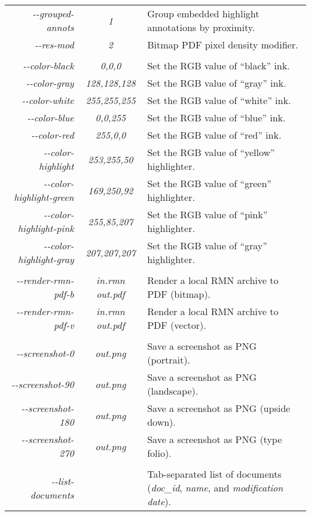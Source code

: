 \begin{longtable}{ r | c | l }
\textit{\--\--grouped-annots} & \textit{1} & Group embedded highlight annotations by proximity. \\
\textit{\--\--res-mod} & \textit{2} & Bitmap PDF pixel density modifier. \\
&&\\
\textit{\--\--color-black} & \textit{0,0,0} & Set the RGB value of ``black'' ink. \\
\textit{\--\--color-gray} & \textit{128,128,128} & Set the RGB value of ``gray'' ink. \\
\textit{\--\--color-white} & \textit{255,255,255} & Set the RGB value of ``white'' ink. \\
\textit{\--\--color-blue} & \textit{0,0,255} & Set the RGB value of ``blue'' ink. \\
\textit{\--\--color-red} & \textit{255,0,0} & Set the RGB value of ``red'' ink. \\
\textit{\--\--color-highlight} & \textit{253,255,50} & Set the RGB value of ``yellow'' highlighter. \\
\textit{\--\--color-highlight-green} & \textit{169,250,92} & Set the RGB value of ``green'' highlighter. \\
\textit{\--\--color-highlight-pink} & \textit{255,85,207} & Set the RGB value of ``pink'' highlighter. \\
\textit{\--\--color-highlight-gray} & \textit{207,207,207} & Set the RGB value of ``gray'' highlighter. \\
&&\\
\textit{\--\--render-rmn-pdf-b} & \textit{in.rmn \hspace{0.2cm} out.pdf} & Render a local RMN archive to PDF (bitmap). \\
\textit{\--\--render-rmn-pdf-v} & \textit{in.rmn \hspace{0.2cm} out.pdf} & Render a local RMN archive to PDF (vector). \\
&&\\
\textit{\--\--screenshot-0}  & \textit{out.png} & Save a screenshot as PNG (portrait). \\
\textit{\--\--screenshot-90} & \textit{out.png} & Save a screenshot as PNG (landscape). \\
\textit{\--\--screenshot-180}  & \textit{out.png} & Save a screenshot as PNG (upside down). \\
\textit{\--\--screenshot-270} & \textit{out.png} & Save a screenshot as PNG (type folio). \\
&&\\
\textit{\--\--list-documents} & & Tab-separated list of documents (\textit{doc\_id}, \textit{name}, and \textit{modification date}). \\

\end{longtable}

